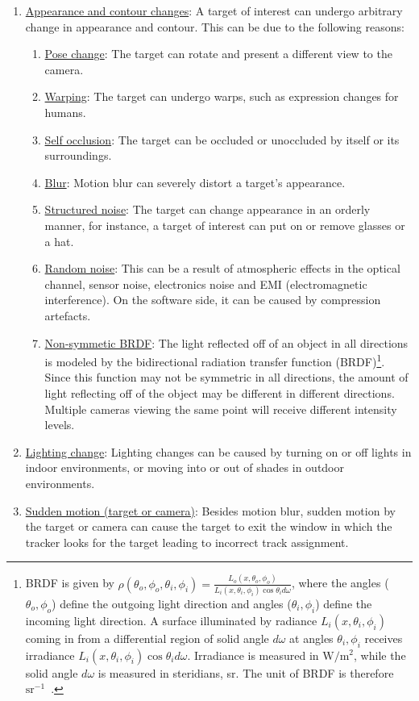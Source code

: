 \begin{enumerate}
\item \underline{Appearance and contour changes}:  A target of interest can undergo arbitrary change in appearance and contour.  This can be due to the following reasons:
\begin{enumerate}
\item \underline{Pose change}:  The target can rotate and present a different view to the camera.
\item \underline{Warping}: The target can undergo warps, such as expression changes for humans.
\item \underline{Self occlusion}:  The target can be occluded or unoccluded by itself or its surroundings.
\item \underline{Blur}:  Motion blur can severely distort a target's appearance.
\item \underline{Structured noise}:  The target can change appearance in an orderly manner, for instance, a target of interest can put on or remove glasses or a hat.
\item \underline{Random noise}:  This can be a result of atmospheric effects in the optical channel, sensor noise, electronics noise and EMI (electromagnetic interference).  On the software side, it can be caused by compression artefacts.
\item \underline{Non-symmetic BRDF}:  The light reflected off of an object in all directions is modeled by the bidirectional radiation transfer function (BRDF)\footnote{BRDF is given by $\rho(\theta_o, \phi_o, \theta_i, \phi_i)=\frac{L_o(x, \theta_o, \phi_o)}{L_i(x, \theta_i, \phi_i)\cos\theta_i d\omega}$, where the angles ($\theta_o, \phi_o$) define the outgoing light direction and angles ($\theta_i, \phi_i$) define the incoming light direction.  A surface illuminated by radiance $L_i(x, \theta_i, \phi_i)$ coming in from a differential region of solid angle $d\omega$ at angles $\theta_i, \phi_i$ receives irradiance $L_i(x, \theta_i, \phi_i)\cos\theta_i d\omega$.  Irradiance is measured in $\mathrm{W/m^2}$, while the solid angle $d\omega$ is measured in steridians, sr.  The unit of BRDF is therefore $\mathrm{sr^{-1}}$~\cite{2002_BOOK_CV_Forsyth}.}.  Since this function may not be symmetric in all directions, the amount of light reflecting off of the object may be different in different directions.  Multiple cameras viewing the same point will receive different intensity levels.
\end{enumerate}
\item \underline{Lighting change}: Lighting changes can be caused by turning on or off lights in indoor environments, or moving into or out of shades in outdoor environments.
\item \underline{Sudden motion (target or camera)}:  Besides motion blur, sudden motion by the target or camera can cause the target to exit the window in which the tracker looks for the target leading to incorrect track assignment.
\end{enumerate}

